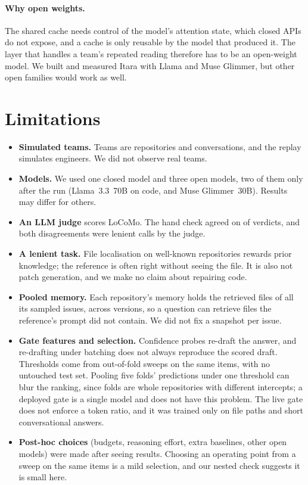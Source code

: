 \documentclass[10pt,twocolumn]{article}
\begin{document}
\paragraph{Why open weights.} The shared cache needs control of the model's attention state, which closed APIs do not expose, and a cache is only reusable by the model that produced it. The layer that handles a team's repeated reading therefore has to be an open-weight model. We built and measured Itara with Llama and Muse Glimmer, but other open families would work as well.

\section{Limitations}
\begin{itemize}
\item \textbf{Simulated teams.} Teams are repositories and conversations, and the replay simulates engineers. We did not observe real teams.
\item \textbf{Models.} We used one closed model and three open models, two of them only after the run (Llama~3.3~70B on code, and Muse Glimmer~30B). Results may differ for others.
\item \textbf{An LLM judge} scores LoCoMo. The hand check agreed on \handAgree{} of \handChecked{} verdicts, and both disagreements were lenient calls by the judge.
\item \textbf{A lenient task.} File localisation on well-known repositories rewards prior knowledge; the reference is often right without seeing the file. It is also not patch generation, and we make no claim about repairing code.
\item \textbf{Pooled memory.} Each repository's memory holds the retrieved files of all its sampled issues, across versions, so a question can retrieve files the reference's prompt did not contain. We did not fix a snapshot per issue.
\item \textbf{Gate features and selection.} Confidence probes re-draft the answer, and re-drafting under batching does not always reproduce the scored draft. Thresholds come from out-of-fold sweeps on the same items, with no untouched test set. Pooling five folds' predictions under one threshold can blur the ranking, since folds are whole repositories with different intercepts; a deployed gate is a single model and does not have this problem. The live gate does not enforce a token ratio, and it was trained only on file paths and short conversational answers.
\item \textbf{Post-hoc choices} (budgets, reasoning effort, extra baselines, other open models) were made after seeing results. Choosing an operating point from a sweep on the same items is a mild selection, and our nested check suggests it is small here.

\end{itemize}
\end{document}
